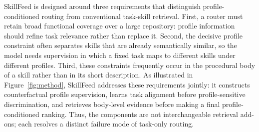 \documentclass[letterpaper]{article} %
\begin{document}


SkillFeed is designed around three requirements that distinguish profile-conditioned routing from conventional task-skill retrieval. First, a router must retain broad functional coverage over a large repository: profile information should refine task relevance rather than replace it. Second, the decisive profile constraint often separates skills that are already semantically similar, so the model needs supervision in which a fixed task maps to different skills under different profiles. Third, these constraints frequently occur in the procedural body of a skill rather than in its short description. As illustrated in Figure~\ref{fig:method}, SkillFeed addresses these requirements jointly: it constructs counterfactual profile supervision, learns task alignment before profile-sensitive discrimination, and retrieves body-level evidence before making a final profile-conditioned ranking. Thus, the components are not interchangeable retrieval add-ons; each resolves a distinct failure mode of task-only routing.
\end{document}
